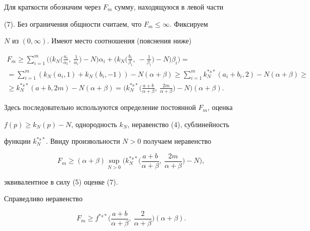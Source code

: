 \begin{pf} 


Для краткости обозначим через $F_m$ сумму, находящуюся в левой части 


(7). Без ограничения общности считаем, что $F_m\le\infty$. Фиксируем 


$N$ из $(0,\infty)$. Имеют место соотношения (пояснения ниже) 


\begin{multline*} 


F_m\ge\sum^m_{i=1}\bigg(\bigg(k_N\bigg(\frac{a_i}{\alpha_i}, 


\ \frac{1}{\alpha_i}\bigg)-N\bigg)\alpha_i+\bigg(k_N\bigg( 


\frac{b_i}{\beta_i},\ -\frac{1}{\beta_i}\bigg)-N\bigg) 


\beta_i\bigg) = \\ 


% 


=\sum^m_{i=1}(k_N(a_i,1)+k_N(b_i,-1))-N(\alpha+\beta)\ge 


\sum^m_{i=1}k^{*s*}_N(a_i+b_i,2)-N(\alpha+\beta)\ge \\ 


% 


\ge k^{*s*}_N(a+b,2m)-N(\alpha+\beta)=\bigg(k^{*s*}_N 


\bigg(\frac{a+b}{\alpha+\beta},\ \frac{2m}{\alpha+\beta}\bigg) 


-N\bigg)(\alpha+\beta). 


\end{multline*} 


Здесь последовательно используются определение постоянной $F_m$, оценка 


$f(p)\ge k_N(p)-N$, однородность $k_N$, неравенство (4), сублинейность 


функции $k^{*s*}_N$. Ввиду произвольности $N>0$ получаем неравенство 


$$ 


F_m\ge(\alpha+\beta)\sup_{N>0}\bigg(k^{*s*}_N\bigg( 


\frac{a+b}{\alpha+\beta},\ \frac{2m}{\alpha+\beta}\bigg)-N\bigg), 


$$ 


эквивалентное в силу (5) оценке (7). 


\end{pf} 


 


\begin{cornonum} 


Справедливо неравенство 


$$ 


F_m\ge f^{*s*}\bigg(\frac{a+b}{\alpha+\beta}, 


\ \frac{2}{\alpha+\beta}\bigg)(\alpha+\beta). 


$$ 


\end{cornonum} 


